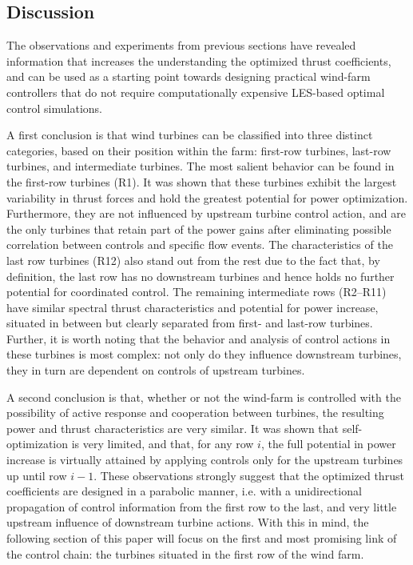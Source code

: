 \documentclass[wes, manuscript]{copernicus}
\begin{document}
\subsection{Discussion}\label{sec:analysis_discussion}

The observations and experiments from previous sections have revealed information that increases the understanding the optimized thrust coefficients, and can be used as a starting point towards designing practical wind-farm controllers that do not require computationally expensive LES-based optimal control simulations. 

A first conclusion is that wind turbines can be classified into three distinct categories, based on their position within the farm: first-row turbines, last-row turbines, and intermediate turbines. The most salient behavior can be found in the first-row turbines (R1). It was shown that these turbines exhibit the largest variability in thrust forces and hold the greatest potential for power optimization. Furthermore, they are not influenced by upstream turbine control action, and are the only turbines that retain part of the power gains after eliminating possible correlation between controls and specific flow events.  
The characteristics of the last row turbines (R12) also stand out from the rest due to the fact that, by definition, the last row has no downstream turbines and hence holds no further potential for coordinated control. 
The remaining intermediate rows (R2--R11) have similar spectral thrust characteristics and potential for power increase, situated in between but clearly separated from first- and last-row turbines. Further, it is worth noting that the behavior and analysis of control actions in these turbines is most complex: not only do they influence downstream turbines, they in turn are dependent on controls of upstream turbines. 

A second conclusion is that, whether or not the wind-farm is controlled with the possibility of active response and cooperation between turbines, the resulting power and thrust characteristics are very similar. It was shown that self-optimization is very limited, and that, for any row $i$, the full potential in power increase is virtually attained by applying controls only for the upstream turbines up until row $i-1$. These observations strongly suggest that the optimized thrust coefficients are designed in a parabolic manner, i.e. with a unidirectional propagation of control information from the first row to the last, and very little upstream influence of downstream turbine actions.
With this in mind, the following section of this paper will focus on the first and most promising link of the control chain: the turbines situated in the first row of the wind farm.
\end{document}
